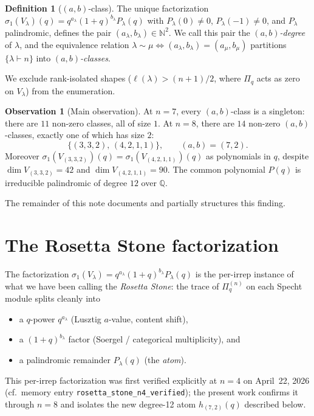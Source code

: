 \documentclass[11pt]{article}
\theoremstyle{definition}
\newtheorem{definition}[theorem]{Definition}
\newtheorem{observation}[theorem]{Observation}
\theoremstyle{remark}
\newcommand{\bbQ}{\mathbb{Q}}
\newcommand{\bbN}{\mathbb{N}}
\newcommand{\Pq}{\Pi_q}
\begin{document}
\begin{definition}[$(a,b)$-class]
The unique factorization
\(
\sigma_1(V_\lambda)(q) = q^{a_\lambda}(1+q)^{b_\lambda} P_\lambda(q)
\)
with $P_\lambda(0) \neq 0$, $P_\lambda(-1) \neq 0$, and $P_\lambda$
palindromic, defines the pair $(a_\lambda, b_\lambda) \in \bbN^2$.
We call this pair the \emph{$(a,b)$-degree} of $\lambda$, and the
equivalence relation $\lambda \sim \mu \iff (a_\lambda, b_\lambda) =
(a_\mu, b_\mu)$ partitions $\{\lambda \vdash n\}$ into
\emph{$(a,b)$-classes}.
\end{definition}

We exclude rank-isolated shapes ($\ell(\lambda) > (n+1)/2$, where
$\Pq$ acts as zero on $V_\lambda$) from the enumeration.

\begin{observation}[Main observation]
At $n=7$, every $(a,b)$-class is a singleton: there are $11$
non-zero classes, all of size $1$.  At $n=8$, there are $14$
non-zero $(a,b)$-classes, exactly one of which has size $2$:
\[
\bigl\{(3,3,2),\,(4,2,1,1)\bigr\}, \qquad (a,b) = (7,2).
\]
Moreover $\sigma_1(V_{(3,3,2)})(q) = \sigma_1(V_{(4,2,1,1)})(q)$ as
polynomials in $q$, despite $\dim V_{(3,3,2)} = 42$ and
$\dim V_{(4,2,1,1)} = 90$.  The common polynomial $P(q)$ is irreducible
palindromic of degree $12$ over $\bbQ$.
\end{observation}

The remainder of this note documents and partially structures this
finding.

\section{The Rosetta Stone factorization}

The factorization
$\sigma_1(V_\lambda) = q^{a_\lambda}(1+q)^{b_\lambda} P_\lambda(q)$ is
the per-irrep instance of what we have been calling the
\emph{Rosetta Stone}: the trace of $\Pq^{(n)}$ on each Specht module
splits cleanly into
\begin{itemize}
\item a $q$-power $q^{a_\lambda}$ (Lusztig $a$-value, content shift),
\item a $(1+q)^{b_\lambda}$ factor (Soergel / categorical
      multiplicity), and
\item a palindromic remainder $P_\lambda(q)$ (the \emph{atom}).
\end{itemize}
This per-irrep factorization was first verified explicitly at $n=4$
on April~22, 2026 (cf.\ memory entry
\texttt{rosetta\_stone\_n4\_verified}); the present work confirms it
through $n=8$ and isolates the new degree-12 atom $h_{(7,2)}(q)$
described below.
\end{document}

